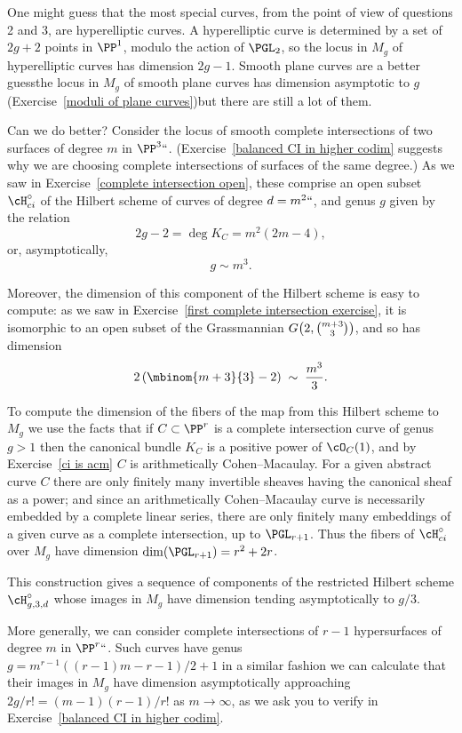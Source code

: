 One might guess that the most special curves, from the point of view of
questions 2 and 3, are hyperelliptic curves. A hyperelliptic curve is
determined by a set of $2g+2$ points in $\PP^{1}$, modulo the action of
%
$\PGL_{2}$,
so the locus in $M_g$ of 
%
hyperelliptic curves
 has dimension
$2g-1$. Smooth plane curves are a better guess\emdash  the locus in $M_g$ of
smooth plane curves has dimension asymptotic to $g$ (Exercise~\ref{moduli
of plane curves})\emdash but there are still a lot of them.

Can we do better?  Consider the locus of smooth complete intersections
of two surfaces of degree $m$ in $\PP^3` `$.
(Exercise~\ref{balanced CI in higher codim}
suggests why we are choosing complete
intersections of surfaces of the same degree.) As we saw in
Exercise~\ref{complete intersection open}, these comprise an open
%
subset $\cH^\circ_{ci}$ of the Hilbert scheme of curves of degree $d =
m^2` `$, and genus $g$ given by the relation
$$
2g-2 = \deg K_C = m^2(2m-4),
$$
or, asymptotically,
$$
g \sim m^3.
$$

Moreover, the dimension of this component of the Hilbert scheme is
easy to compute: as we saw in Exercise~\ref{first complete intersection
exercise},  it is isomorphic to an open subset of the Grassmannian
$G\bigl(2, \tbinom{m+3}{3}\bigr)$, and so has dimension
$$
2\left(\mbinom{m+3}{3} - 2\right) \; \sim \; \frac{m^3}{3}.
$$

To compute the dimension of the fibers of the map from this Hilbert
scheme to $M_{g}$ we use
the facts that if $C \subset \PP^r$ is a complete intersection curve
of genus $g >1$ then the canonical bundle $K_C$ is a positive power
of $\cO_C(1)$, and by Exercise~\ref{ci is acm}  $C$ is
arithmetically Cohen--Macaulay.
%
For a given abstract curve $C$ there are only finitely many invertible
sheaves having the canonical sheaf as a power; and since an arithmetically
Cohen--Macaulay curve is necessarily embedded by a complete linear series,
there are only finitely many embeddings of a given curve as a complete
intersection, up to $\PGL_{r+1}$. Thus the fibers of $\cH^\circ_{ci}$
over $M_g$ have dimension $\dim(\PGL_{r+1}) = r^2 + 2r$.

This construction gives 
a sequence of components of the restricted
Hilbert scheme $\cH^\circ_{g,3,d}$ whose images in $M_g$ have dimension
%
tending asymptotically to $g/3$.

More generally, we can consider 
complete intersections
%
of $r-1$
hypersurfaces of degree $m$ in $\PP^r` `$. Such curves have
genus $g = m^{r-1}((r-1)m-r-1)/2 +1$ in a similar fashion we can calculate
that their images in $M_g$ have dimension asymptotically approaching
$2g/r!= (m-1)(r-1)/r!$
 as $m \to \infty$, as we ask you to verify in Exercise~\ref{balanced
 CI in higher codim}.


